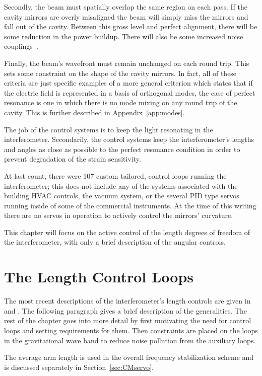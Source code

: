 Secondly, the beam must spatially overlap the same region on each pass. If
the cavity mirrors are overly misaligned the beam will simply miss the
mirrors and fall out of the cavity. Between this gross level and perfect
alignment, there will be some reduction in the power buildup. There will
also be some increased noise couplings~\cite{Yaron:Alignment}.

Finally, the beam's wavefront must remain unchanged on each round trip. This
sets some constraint on the shape of the cavity mirrors. In fact, all of
these criteria are just specific examples of a more general criterion which
states that if the electric field is represented in a basis of
orthogonal modes, the
case of perfect resonance is one in which there is no mode mixing on any
round trip of the cavity. This is further described in Appendix~\ref{app:modes}.

The job of the control systems is to keep the light resonating in the
interferometer. Secondarily, the control systems keep the interferometer's
lengths and angles as close as possible to the perfect resonance condition
in order to prevent degradation of the strain sensitivity.

At last count, there were 107 custom tailored, control loops running the 
interferometer; this does not include any of the systems associated with the 
building HVAC controls, the vacuum system, or the several PID type servos
running inside of some of the commercial instruments. At the time of this
writing there are no servos in operation to actively control the mirrors'
curvature. 

This chapter will focus on the active control of the length 
degrees of freedom of the interferometer, with only a brief description of
the angular controls.


\section{The Length Control Loops}
\label{sec:LSC}

The most recent descriptions of the interferometer's length controls are given
in \cite{Sigg:Readout} and \cite{S1:Inst}. The following paragraph gives a
brief description of the generalities. The rest of the chapter goes into more
detail by first motivating the need for control loops and setting requirements
for them. Then constraints are placed on the loops in the gravitational wave band to reduce
noise pollution from the auxiliary loops.

The average arm length is used in the overall frequency stabilization
scheme and is discussed separately in Section~\ref{sec:CMservo}.

